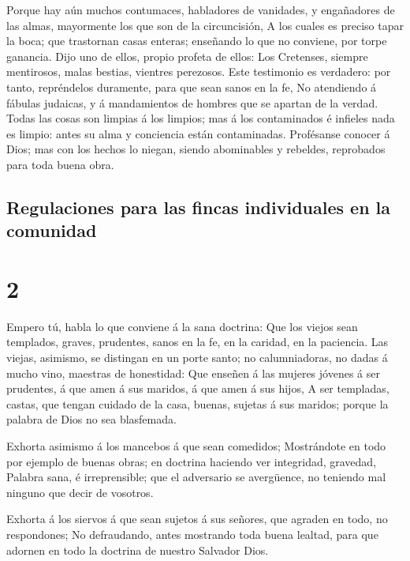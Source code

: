  Porque hay aún muchos contumaces, habladores de
vanidades, y engañadores de las almas, mayormente los que son de la
circuncisión,  A los cuales es preciso tapar la boca; que
trastornan casas enteras; enseñando lo que no conviene, por torpe
ganancia.  Dijo uno de ellos, propio profeta de ellos:
Los Cretenses, siempre mentirosos, malas bestias, vientres perezosos.
 Este testimonio es verdadero: por tanto, repréndelos
duramente, para que sean sanos en la fe,  No atendiendo á
fábulas judaicas, y á mandamientos de hombres que se apartan de la
verdad.  Todas las cosas son limpias á los limpios; mas á
los contaminados é infieles nada es limpio: antes su alma y conciencia
están contaminadas.  Profésanse conocer á Dios; mas con
los hechos lo niegan, siendo abominables y rebeldes, reprobados para
toda buena obra.

\hypertarget{regulaciones-para-las-fincas-individuales-en-la-comunidad}{%
\subsection{Regulaciones para las fincas individuales en la
comunidad}\label{regulaciones-para-las-fincas-individuales-en-la-comunidad}}

\hypertarget{section-1}{%
\section{2}\label{section-1}}

 Empero tú, habla lo que conviene á la sana doctrina:
 Que los viejos sean templados, graves, prudentes, sanos
en la fe, en la caridad, en la paciencia.  Las viejas,
asimismo, se distingan en un porte santo; no calumniadoras, no dadas á
mucho vino, maestras de honestidad:  Que enseñen á las
mujeres jóvenes á ser prudentes, á que amen á sus maridos, á que amen á
sus hijos,  A ser templadas, castas, que tengan cuidado de
la casa, buenas, sujetas á sus maridos; porque la palabra de Dios no sea
blasfemada.

 Exhorta asimismo á los mancebos á que sean comedidos;
 Mostrándote en todo por ejemplo de buenas obras; en
doctrina haciendo ver integridad, gravedad,  Palabra sana,
é irreprensible; que el adversario se avergüence, no teniendo mal
ninguno que decir de vosotros.

 Exhorta á los siervos á que sean sujetos á sus señores,
que agraden en todo, no respondones;  No defraudando,
antes mostrando toda buena lealtad, para que adornen en todo la doctrina
de nuestro Salvador Dios.

